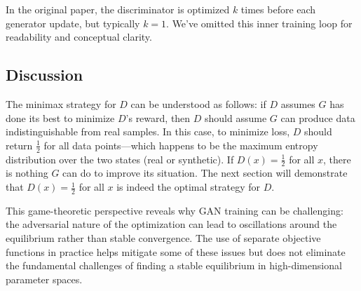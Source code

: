 In the original paper, the discriminator is optimized $k$ times before each generator update, but typically $k=1$. We've omitted this inner training loop for readability and conceptual clarity.

\subsection{Discussion}

The minimax strategy for $D$ can be understood as follows: if $D$ assumes $G$ has done its best to minimize $D$'s reward, then $D$ should assume $G$ can produce data indistinguishable from real samples. In this case, to minimize loss, $D$ should return $\frac{1}{2}$ for all data points—which happens to be the maximum entropy distribution over the two states (real or synthetic). If $D(x) = \frac{1}{2}$ for all $x$, there is nothing $G$ can do to improve its situation. The next section will demonstrate that $D(x) = \frac{1}{2}$ for all $x$ is indeed the optimal strategy for $D$.

This game-theoretic perspective reveals why GAN training can be challenging: the adversarial nature of the optimization can lead to oscillations around the equilibrium rather than stable convergence. The use of separate objective functions in practice helps mitigate some of these issues but does not eliminate the fundamental challenges of finding a stable equilibrium in high-dimensional parameter spaces.

